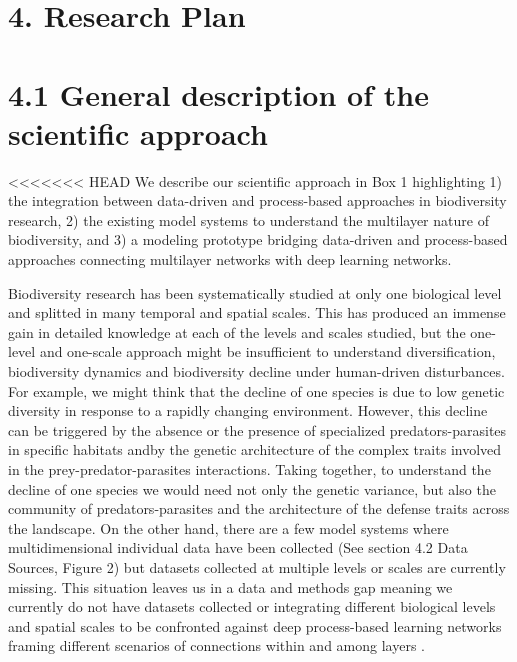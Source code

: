 \documentclass[12pt]{article}
\begin{document}
\begin{center}
\section*{4. Research Plan}

\section*{4.1 General description of the scientific approach}

<<<<<<< HEAD
We describe our scientific approach in Box 1 highlighting 1) the integration between data-driven and process-based approaches in biodiversity research, 2) the existing model systems to understand the multilayer nature of biodiversity, and 3) a modeling prototype bridging data-driven and process-based approaches connecting multilayer networks with deep learning networks. 

Biodiversity research has been systematically studied at only one biological level and splitted in many temporal and spatial scales. This has produced an immense gain in detailed knowledge at each of the levels and scales studied, but the one-level and one-scale approach might be insufficient to understand diversification, biodiversity dynamics and biodiversity decline under human-driven disturbances. For example, we might think that the decline of one species is due to low genetic diversity in response to a rapidly changing environment. However, this decline can be triggered by the absence or the presence of specialized predators-parasites in specific habitats and\or by the genetic architecture of the complex traits involved in the prey-predator-parasites interactions. Taking together, to understand the decline of one species we would need not only the genetic variance, but also the community of predators-parasites and the architecture of the defense traits across the landscape. On the other hand, there are a few model systems where multidimensional individual data have been collected (See section 4.2 Data Sources, Figure 2) but datasets collected at multiple levels or scales are currently missing. This situation leaves us in a data and methods gap meaning we currently do not have datasets collected or integrating different biological levels and spatial scales to be confronted against deep process-based learning networks framing different scenarios of connections within and among layers \citep{Reichsteinetal:2019}. 
 


\end{center}
\end{document}
